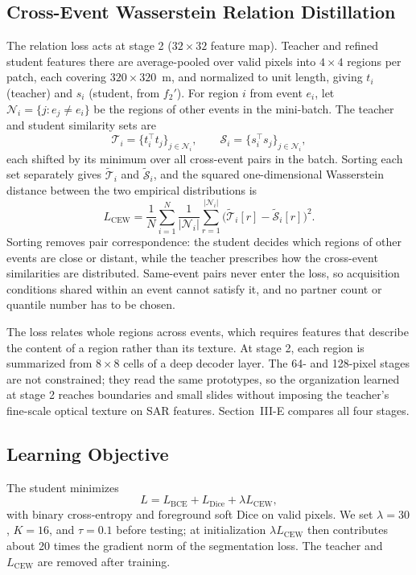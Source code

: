 \documentclass[journal]{IEEEtran}
\begin{document}
\subsection{Cross-Event Wasserstein Relation Distillation}
The relation loss acts at stage 2 ($32\times32$ feature map). Teacher and refined student features there are average-pooled over valid pixels into $4\times4$ regions per patch, each covering $320\times320$~m, and normalized to unit length, giving $t_i$ (teacher) and $s_i$ (student, from $f_2'$). For region $i$ from event $e_i$, let $\mathcal{N}_i=\{j: e_j\neq e_i\}$ be the regions of other events in the mini-batch. The teacher and student similarity sets are
\begin{equation}
\mathcal{T}_i=\{t_i^\top t_j\}_{j\in\mathcal{N}_i},\qquad \mathcal{S}_i=\{s_i^\top s_j\}_{j\in\mathcal{N}_i},
\end{equation}
each shifted by its minimum over all cross-event pairs in the batch. Sorting each set separately gives $\tilde{\mathcal{T}}_i$ and $\tilde{\mathcal{S}}_i$, and the squared one-dimensional Wasserstein distance between the two empirical distributions is
\begin{equation}
L_{\mathrm{CEW}}=\frac{1}{N}\sum_{i=1}^{N}\frac{1}{|\mathcal{N}_i|}\sum_{r=1}^{|\mathcal{N}_i|}\bigl(\tilde{\mathcal{T}}_i[r]-\tilde{\mathcal{S}}_i[r]\bigr)^2 .
\label{eq:cew}
\end{equation}
Sorting removes pair correspondence: the student decides which regions of other events are close or distant, while the teacher prescribes how the cross-event similarities are distributed. Same-event pairs never enter the loss, so acquisition conditions shared within an event cannot satisfy it, and no partner count or quantile number has to be chosen.

The loss relates whole regions across events, which requires features that describe the content of a region rather than its texture. At stage 2, each region is summarized from $8\times8$ cells of a deep decoder layer. The 64- and 128-pixel stages are not constrained; they read the same prototypes, so the organization learned at stage 2 reaches boundaries and small slides without imposing the teacher's fine-scale optical texture on SAR features. Section~III-E compares all four stages.

\subsection{Learning Objective}
The student minimizes
\begin{equation}
L=L_{\mathrm{BCE}}+L_{\mathrm{Dice}}+\lambda L_{\mathrm{CEW}},
\label{eq:loss}
\end{equation}
with binary cross-entropy and foreground soft Dice on valid pixels. We set $\lambda=30$, $K=16$, and $\tau=0.1$ before testing; at initialization $\lambda L_{\mathrm{CEW}}$ then contributes about 20 times the gradient norm of the segmentation loss. The teacher and $L_{\mathrm{CEW}}$ are removed after training.
\end{document}
